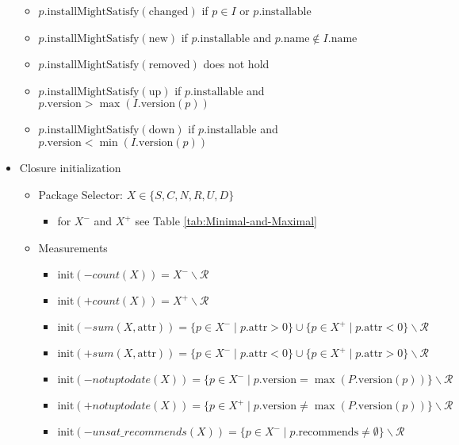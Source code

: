 \documentclass[a4paper,english]{article}
\begin{document}
\begin{itemize}
\begin{itemize}
      \item $p.\mathrm{installMightSatisfy}(\mathrm{changed})$ if $p\in I$ or $p.\mathrm{installable}$
      \item $p.\mathrm{installMightSatisfy}(\mathrm{new})$ if $p.\mathrm{installable}$ and $p.\mathrm{name}\not\in I.\mathrm{name}$
      \item $p.\mathrm{installMightSatisfy}(\mathrm{removed})$ does not hold
      \item $p.\mathrm{installMightSatisfy}(\mathrm{up})$ if $p.\mathrm{installable}$ and $p.\mathrm{version}>\max(I.\mathrm{version}(p))$
      \item $p.\mathrm{installMightSatisfy}(\mathrm{down})$ if $p.\mathrm{installable}$ and $p.\mathrm{version}<\min(I.\mathrm{version}(p))$
    \end{itemize}
  \item Closure initialization
    \begin{itemize}
      \item Package Selector: $X\in\{S,C,N,R,U,D\}$
        \begin{itemize}
          \item for $X^{-}$ and $X^{+}$ see Table \ref{tab:Minimal-and-Maximal}
        \end{itemize}
      \item Measurements
        \begin{itemize}
          \item $\mathrm{init}({-}\mathit{count}(X))=X^{-}\backslash\mathcal{R}$
          \item $\mathrm{init}({+}\mathit{count}(X))=X^{+}\backslash\mathcal{R}$
          \item $\mathrm{init}({-}\mathit{sum}(X,\mathrm{attr}))=\{p\in X^{-}\mid p.\mathrm{attr}>0\}\cup\{p\in X^{+}\mid p.\mathrm{attr}<0\}\backslash\mathcal{R}$
          \item $\mathrm{init}({+}\mathit{sum}(X,\mathrm{attr}))=\{p\in X^{-}\mid p.\mathrm{attr}<0\}\cup\{p\in X^{+}\mid p.\mathrm{attr}>0\}\backslash\mathcal{R}$
          \item $\mathrm{init}({-}\mathit{notuptodate}(X))=\{p\in X^{-}\mid p.\mathrm{version}=\max(P.\mathrm{version}(p))\}\backslash\mathcal{R}$
          \item $\mathrm{init}({+}\mathit{notuptodate}(X))=\{p\in X^{+}\mid p.\mathrm{version}\not=\max(P.\mathrm{version}(p))\}\backslash\mathcal{R}$
          \item $\mathrm{init}({-}\mathit{unsat\_recommends}(X))=\{p\in X^{-}\mid p.\mathrm{recommends}\neq\emptyset\}\backslash\mathcal{R}$

\end{itemize}
\end{itemize}
\end{itemize}
\end{document}
